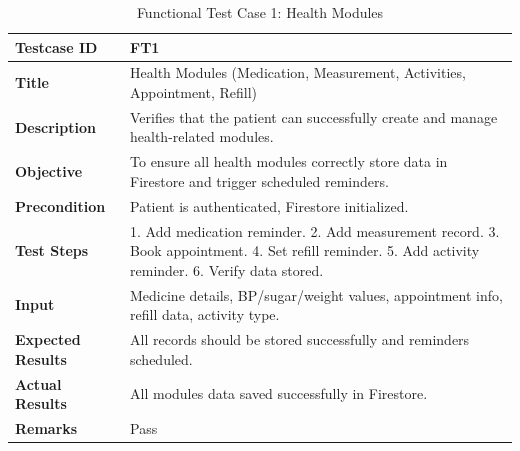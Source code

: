 
\begin{table}[H]
\centering
\caption{Functional Test Case 1: Health Modules}
\begin{tabularx}{\textwidth}{|l|X|}
\hline
\textbf{Testcase ID} & FT1 \\ \hline
\textbf{Title} & Health Modules (Medication, Measurement, Activities, Appointment, Refill) \\ \hline
\textbf{Description} & Verifies that the patient can successfully create and manage health-related modules. \\ \hline
\textbf{Objective} & To ensure all health modules correctly store data in Firestore and trigger scheduled reminders. \\ \hline
\textbf{Precondition} & Patient is authenticated, Firestore initialized. \\ \hline
\textbf{Test Steps} & 1. Add medication reminder. 2. Add measurement record. 3. Book appointment. 4. Set refill reminder. 5. Add activity reminder. 6. Verify data stored. \\ \hline
\textbf{Input} & Medicine details, BP/sugar/weight values, appointment info, refill data, activity type. \\ \hline
\textbf{Expected Results} & All records should be stored successfully and reminders scheduled. \\ \hline
\textbf{Actual Results} & All modules data saved successfully in Firestore. \\ \hline
\textbf{Remarks} & Pass \\ \hline
\end{tabularx}
\end{table}

